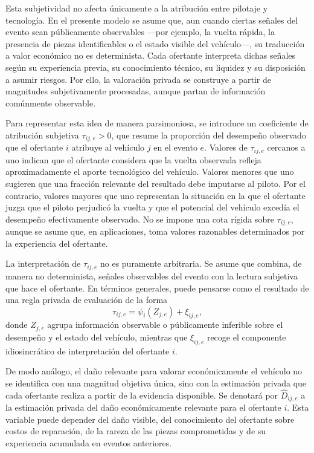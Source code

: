 \documentclass[11pt,a4paper]{article}
\theoremstyle{definition}
\begin{document}
Esta subjetividad no afecta únicamente a la atribución entre pilotaje y tecnología. En el presente modelo se asume que, aun cuando ciertas señales del evento sean públicamente observables ---por ejemplo, la vuelta rápida, la presencia de piezas identificables o el estado visible del vehículo---, su traducción a valor económico no es determinista. Cada ofertante interpreta dichas señales según su experiencia previa, su conocimiento técnico, su liquidez y su disposición a asumir riesgos. Por ello, la valoración privada se construye a partir de magnitudes subjetivamente procesadas, aunque partan de información comúnmente observable.

Para representar esta idea de manera parsimoniosa, se introduce un coeficiente de atribución subjetiva $\tau_{ij,e}>0$, que resume la proporción del desempeño observado que el ofertante $i$ atribuye al vehículo $j$ en el evento $e$. Valores de $\tau_{ij,e}$ cercanos a uno indican que el ofertante considera que la vuelta observada refleja aproximadamente el aporte tecnológico del vehículo. Valores menores que uno sugieren que una fracción relevante del resultado debe imputarse al piloto. Por el contrario, valores mayores que uno representan la situación en la que el ofertante juzga que el piloto perjudicó la vuelta y que el potencial del vehículo excedía el desempeño efectivamente observado. No se impone una cota rígida sobre $\tau_{ij,e}$, aunque se asume que, en aplicaciones, toma valores razonables determinados por la experiencia del ofertante.

La interpretación de $\tau_{ij,e}$ no es puramente arbitraria. Se asume que combina, de manera no determinista, señales observables del evento con la lectura subjetiva que hace el ofertante. En términos generales, puede pensarse como el resultado de una regla privada de evaluación de la forma
\[
\tau_{ij,e}=\psi_i(Z_{j,e})+\xi_{ij,e},
\]
donde $Z_{j,e}$ agrupa información observable o públicamente inferible sobre el desempeño y el estado del vehículo, mientras que $\xi_{ij,e}$ recoge el componente idiosincrático de interpretación del ofertante $i$.

De modo análogo, el daño relevante para valorar económicamente el vehículo no se identifica con una magnitud objetiva única, sino con la estimación privada que cada ofertante realiza a partir de la evidencia disponible. Se denotará por $\widehat D_{ij,e}$ a la estimación privada del daño económicamente relevante para el ofertante $i$. Esta variable puede depender del daño visible, del conocimiento del ofertante sobre costos de reparación, de la rareza de las piezas comprometidas y de su experiencia acumulada en eventos anteriores.
\end{document}
